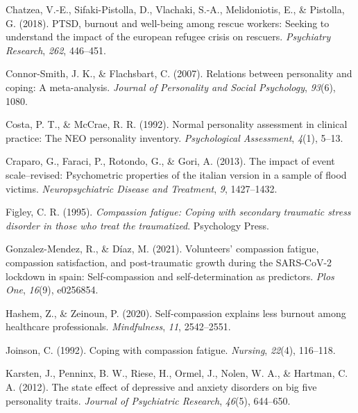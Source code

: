 \documentclass[
  man]{apa7}
\newlength{\cslhangindent}
\newlength{\cslentryspacingunit} %
\newenvironment{CSLReferences}[2] %
 {%
  \setlength{\parindent}{0pt}
  \ifodd #1
  \let\oldpar\par
  \def\par{\hangindent=\cslhangindent\oldpar}
  \fi
  \setlength{\parskip}{#2\cslentryspacingunit}
 }%
 {}
\begin{document}
\begin{CSLReferences}{1}{0}
\leavevmode{}%
Chatzea, V.-E., Sifaki-Pistolla, D., Vlachaki, S.-A., Melidoniotis, E., \& Pistolla, G. (2018). PTSD, burnout and well-being among rescue workers: Seeking to understand the impact of the european refugee crisis on rescuers. \emph{Psychiatry Research}, \emph{262}, 446--451.

\leavevmode{}%
Connor-Smith, J. K., \& Flachsbart, C. (2007). Relations between personality and coping: A meta-analysis. \emph{Journal of Personality and Social Psychology}, \emph{93}(6), 1080.

\leavevmode{}%
Costa, P. T., \& McCrae, R. R. (1992). Normal personality assessment in clinical practice: The NEO personality inventory. \emph{Psychological Assessment}, \emph{4}(1), 5--13.

\leavevmode{}%
Craparo, G., Faraci, P., Rotondo, G., \& Gori, A. (2013). The impact of event scale--revised: Psychometric properties of the italian version in a sample of flood victims. \emph{Neuropsychiatric Disease and Treatment}, \emph{9}, 1427--1432.

\leavevmode{}%
Figley, C. R. (1995). \emph{Compassion fatigue: Coping with secondary traumatic stress disorder in those who treat the traumatized}. Psychology Press.

\leavevmode{}%
Gonzalez-Mendez, R., \& Díaz, M. (2021). Volunteers' compassion fatigue, compassion satisfaction, and post-traumatic growth during the SARS-CoV-2 lockdown in spain: Self-compassion and self-determination as predictors. \emph{Plos One}, \emph{16}(9), e0256854.

\leavevmode{}%
Hashem, Z., \& Zeinoun, P. (2020). Self-compassion explains less burnout among healthcare professionals. \emph{Mindfulness}, \emph{11}, 2542--2551.

\leavevmode{}%
Joinson, C. (1992). Coping with compassion fatigue. \emph{Nursing}, \emph{22}(4), 116--118.

\leavevmode{}%
Karsten, J., Penninx, B. W., Riese, H., Ormel, J., Nolen, W. A., \& Hartman, C. A. (2012). The state effect of depressive and anxiety disorders on big five personality traits. \emph{Journal of Psychiatric Research}, \emph{46}(5), 644--650.


\end{CSLReferences}
\end{document}
